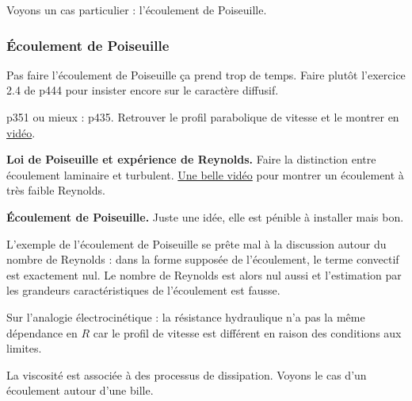 \begin{transition}
Voyons un cas particulier : l'écoulement de Poiseuille.
\end{transition}

\subsubsection{Écoulement de Poiseuille}

\begin{remarque}
Pas faire l'écoulement de Poiseuille ça prend trop de temps.
Faire plutôt l'exercice 2.4 de \cite{Olivier2000} p444 pour insister encore sur le caractère diffusif.
\end{remarque}

\cite{Sanz2016} p351 ou mieux : \cite{Olivier2000} p435.
Retrouver le profil parabolique de vitesse et le montrer en \href{http://culturesciencesphysique.ens-lyon.fr/la-physique-animee/la-physique-animee-une-serie-de-videos-de-physique}{vidéo}.

\begin{slide}
\textbf{Loi de Poiseuille et expérience de Reynolds.}
Faire la distinction entre écoulement laminaire et turbulent.
\href{https://www.youtube.com/watch?v=k7ZZtxdtmeQ}{Une belle vidéo} pour montrer un écoulement à très faible Reynolds.
\end{slide}

\begin{experience}
\textbf{Écoulement de Poiseuille.}
Juste une idée, elle est pénible à installer mais bon.
\end{experience}

\begin{remarque}
L'exemple de l'écoulement de Poiseuille se prête mal à la discussion autour du nombre de Reynolds : dans la forme supposée de l'écoulement, le terme convectif est exactement nul.
Le nombre de Reynolds est alors nul aussi et l'estimation par les grandeurs caractéristiques de l'écoulement est fausse.

\noindent
Sur l'analogie électrocinétique : la résistance hydraulique n'a pas la même dépendance en $R$ car le profil de vitesse est différent en raison des conditions aux limites.
\end{remarque}

\begin{transition}
La viscosité est associée à des processus de dissipation.
Voyons le cas d'un écoulement autour d'une bille.
\end{transition}


